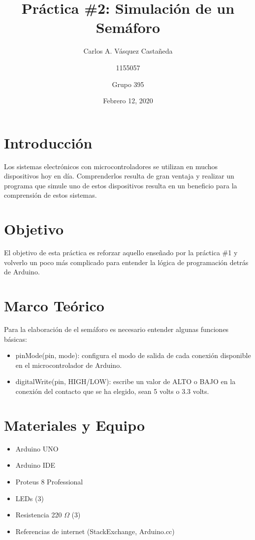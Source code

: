 \documentclass[12pt, letterpaper]{article}
\title{Práctica \#2: Simulación de un Semáforo}
\author{Carlos A. Vásquez Castañeda \and 1155057 \and Grupo 395}
\date{Febrero 12, 2020}
\begin{document}
\maketitle
\section*{Introducción}

Los sistemas electrónicos con microcontroladores se utilizan en muchos dispositivos hoy en día. Comprenderlos resulta de gran ventaja y realizar un programa que simule uno de estos dispositivos resulta en un beneficio para la comprensión de estos sistemas.

\section*{Objetivo}

El objetivo de esta práctica es reforzar aquello enseñado por la práctica \#1 y volverlo un poco más complicado para entender la lógica de programación detrás de Arduino. 

\section*{Marco Teórico}
Para la elaboración de el semáforo es necesario entender algunas funciones básicas:

\begin{itemize}
	\item pinMode(pin, mode): configura el modo de salida de cada conexión disponible en el microcontrolador de Arduino.
	\item digitalWrite(pin, HIGH/LOW): escribe un valor de ALTO o BAJO en la conexión del contacto que se ha elegido, sean 5 volts o 3.3 volts.
\end{itemize}

\section*{Materiales y Equipo}
\begin{itemize}
	\item Arduino UNO
	\item Arduino IDE
	\item Proteus 8 Professional
	\item LEDs (3)
	\item Resistencia 220 $\Omega$ (3)
	\item Referencias de internet (StackExchange, Arduino.cc)
\end{itemize}
\end{document}
